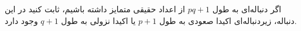  \p
  اگر دنباله‌ای به طول 
  $pq + 1$
  از اعداد حقیقی متمایز داشته باشیم، ثابت کنید در این دنباله، زیر‌دنباله‌ای اکیدا صعودی به طول 
  $p+1$
  یا اکیدا نزولی به طول 
  $q+1$
  وجود دارد. 